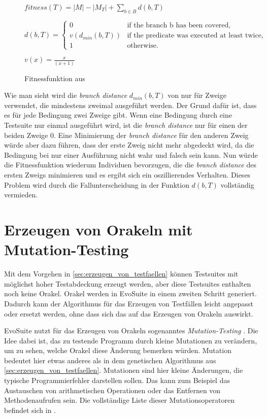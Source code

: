 \documentclass[a4paper,11pt]{article}
\begin{document}
\begin{figure}[h]
	$fitness(T) = |M| - |M_T| + \sum\limits_{b \in B} d(b, T)$

	$d(b, T) = \begin{cases}
	0 & \text{if the branch b has been covered,}\\
	v(d_{min}(b, T)) & \text{if the predicate was executed at least twice,}\\
	1 & \text{otherwise.}
	\end{cases}$

	$v(x) = \frac{x}{(x+1)}$
	\caption{Fitnessfunktion aus \cite{TSE12_EvoSuite}}
	\label{fig:fitnessfunktion}
\end{figure}

Wie man sieht wird die \textit{branch distance} $d_{min}(b, T)$ von \citet{10.1109/32.57624} nur für Zweige verwendet, die mindestens zweimal ausgeführt werden.
Der Grund dafür ist, dass es für jede Bedingung zwei Zweige gibt.
Wenn eine Bedingung durch eine Testsuite nur einmal ausgeführt wird, ist die \textit{branch distance} nur für einen der beiden Zweige 0.
Eine Minimierung der \textit{branch distance} für den anderen Zweig würde aber dazu führen, dass der erste Zweig nicht mehr abgedeckt wird, da die Bedingung bei nur einer Ausführung nicht wahr und falsch sein kann.
Nun würde die Fitnessfunktion wiederum Individuen bevorzugen, die die \textit{branch distance} des ersten Zweigs minimieren und es ergibt sich ein oszillierendes Verhalten.
Dieses Problem wird durch die Fallunterscheidung in der Funktion $d(b, T)$ vollständig vermieden.

\section{Erzeugen von Orakeln mit Mutation-Testing}
\label{sec:erzeugen_von_orakeln}

Mit dem Vorgehen in \cref{sec:erzeugen_von_testfaellen} können Testsuites mit möglichst hoher Testabdeckung erzeugt werden, aber diese Testsuites enthalten noch keine Orakel.
Orakel werden in EvoSuite in einem zweiten Schritt generiert.
Dadurch kann der Algorithmus für das Erzeugen von Testfällen leicht angepasst oder ersetzt werden, ohne dass sich das auf das Erzeugen von Orakeln auswirkt.

EvoSuite nutzt für das Erzeugen von Orakeln sogenanntes \textit{Mutation-Testing} \cite{TSE12_Mutation, emse14_mutation}.
Die Idee dabei ist, das zu testende Programm durch kleine Mutationen zu verändern, um zu sehen, welche Orakel diese Änderung bemerken würden.
Mutation bedeutet hier etwas anderes als in dem genetischen Algorithmus aus \cref{sec:erzeugen_von_testfaellen}.
Mutationen sind hier kleine Änderungen, die typische Programmierfehler darstellen sollen.
Das kann zum Beispiel das Austauschen von arithmetischen Operationen oder das Entfernen von Methodenaufrufen sein.
Die vollständige Liste dieser Mutationsoperatoren befindet sich in \cite{emse14_mutation}.
\end{document}
